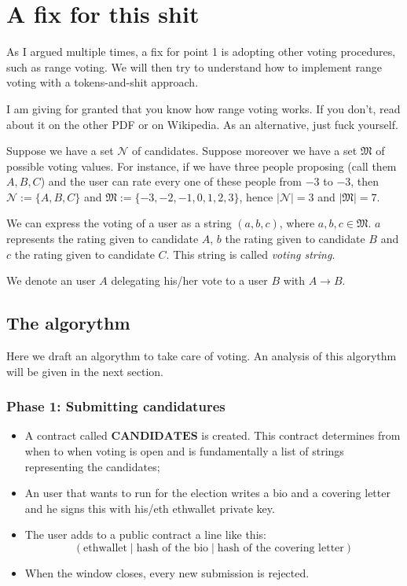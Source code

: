\documentclass[submission, copyright,creativecommons,sharealike,noncommercial]{eptcs}
\begin{document}
\section{A fix for this shit}
	As I argued multiple times, a fix for point 1 is adopting other voting procedures, such as range voting. We will then try to understand how to implement range voting with a tokens-and-shit approach.
	
	I am giving for granted that you know how range voting works. If you don't, read about it on the other PDF or on Wikipedia. As an alternative, just fuck yourself.
	
	\begin{definition}\label{voting string}
		Suppose we have a set $\mathcal{N}$ of candidates. Suppose moreover we have a set $\mathfrak{M}$ of possible voting values. For instance, if we have three people proposing (call them $A, B, C$) and the user can rate every one of these people from $-3$ to $-3$, then $\mathcal{N} := \{A, B, C\}$ and $\mathfrak{M} := \{-3,-2,-1,0,1,2,3\}$, hence $|\mathcal{N}| = 3$ and $|\mathfrak{M}|=7$.
		
		We can express the voting of a user as a string $(a,b,c)$, where $a,b,c \in \mathfrak{M}$. $a$ represents the rating given to candidate $A$, $b$ the rating given to candidate $B$ and $c$ the rating given to candidate $C$. This string is called \emph{voting string}.
	\end{definition}
	\begin{definition}
 		We denote an user $A$ delegating his/her vote to a user $B$ with $A \to B$.
	\end{definition}
	
	\subsection{The algorythm}
		Here we draft an algorythm to take care of voting. An analysis of this algorythm will be given in the next section.
		\subsubsection{Phase 1: Submitting candidatures}
		
		\begin{itemize}
			\item A contract called $\textbf{CANDIDATES}$ is created. This contract determines from when to when voting is open and is fundamentally a list of strings representing the candidates;
			
			\item An user that wants to run for the election writes a bio and a covering letter and he signs this with his/eth ethwallet private key.
			
			\item The user adds to a public contract a line like this:
			\[
			(\text{ethwallet} \mid \text{hash of the bio} \mid \text{hash of the covering letter})
			\]
			
			\item When the window closes, every new submission is rejected. 
		\end{itemize}
		
\end{document}
